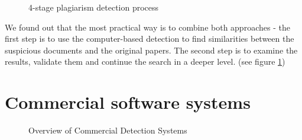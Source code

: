  \begin{figure}[!h]
  \centering
  \caption{4-stage plagiarism detection process}
  \label{fig:4-stage plagiarism detection process}
\end{figure}

We found out that the most practical way is to combine both approaches - the first step is to use the computer-based detection to find similarities between the suspicious documents and the original papers. The second step is to examine the results, validate them and continue the search in a deeper level.\citep{PI:2001} (see figure \ref{fig:4-stage plagiarism detection process}) 



\section{Commercial software systems} 

 
 \begin{figure}[!h]
  \centering
  \caption{Overview of Commercial Detection Systems}
  \label{fig:overview_systems}
\end{figure}




